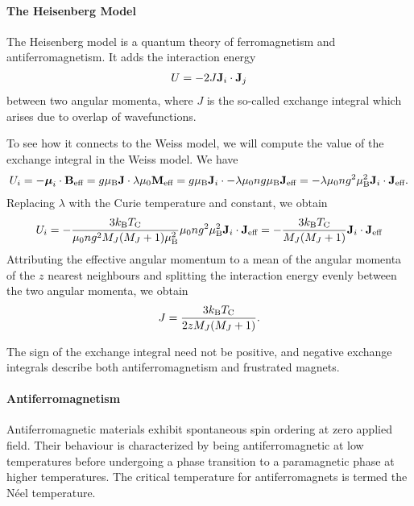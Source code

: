 \paragraph{The Heisenberg Model}
The Heisenberg model is a quantum theory of ferromagnetism and antiferromagnetism. It adds the interaction energy
\begin{align*}
	U = -2J\vb{J}_{i}\cdot\vb{J}_{j}
\end{align*}
between two angular momenta, where $J$ is the so-called exchange integral which arises due to overlap of wavefunctions.

To see how it connects to the Weiss model, we will compute the value of the exchange integral in the Weiss model. We have
\begin{align*}
	U_{i} = -\vb*{\mu}_{i}\cdot\vb{B}_{\text{eff}} = g\mu_{\text{B}}\vb{J}\cdot\lambda\mu_{0}\vb{M}_{\text{eff}} = g\mu_{\text{B}}\vb{J}_{i}\cdot -\lambda\mu_{0}ng\mu_{\text{B}}\vb{J}_{\text{eff}} = -\lambda\mu_{0}ng^{2}\mu_{\text{B}}^{2}\vb{J}_{i}\cdot\vb{J}_{\text{eff}}.
\end{align*}
Replacing $\lambda$ with the Curie temperature and constant, we obtain
\begin{align*}
	U_{i} = -\frac{3k_{\text{B}} T_{\text{C}}}{\mu_{0}ng^{2}M_{J}(M_{J} + 1)\mu_{\text{B}}^{2}}\mu_{0}ng^{2}\mu_{\text{B}}^{2}\vb{J}_{i}\cdot\vb{J}_{\text{eff}} = -\frac{3k_{\text{B}} T_{\text{C}}}{M_{J}(M_{J} + 1)}\vb{J}_{i}\cdot\vb{J}_{\text{eff}}
\end{align*}
Attributing the effective angular momentum to a mean of the angular momenta of the $z$ nearest neighbours and splitting the interaction energy evenly between the two angular momenta, we obtain
\begin{align*}
	J = \frac{3k_{\text{B}} T_{\text{C}}}{2zM_{J}(M_{J} + 1)}.
\end{align*}

The sign of the exchange integral need not be positive, and negative exchange integrals describe both antiferromagnetism and frustrated magnets.

\paragraph{Antiferromagnetism}
Antiferromagnetic materials exhibit spontaneous spin ordering at zero applied field. Their behaviour is characterized by being antiferromagnetic at low temperatures before undergoing a phase transition to a paramagnetic phase at higher temperatures. The critical temperature for antiferromagnets is termed the Néel temperature.

